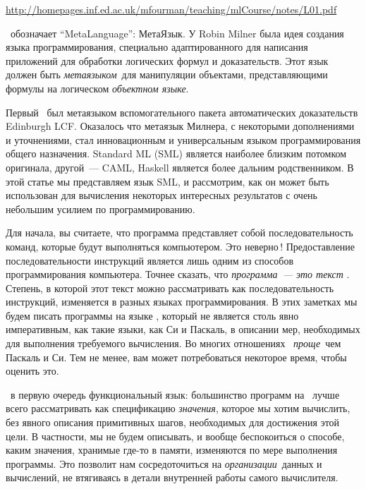 \label{fourmanru}\secdown

\url{http://homepages.inf.ed.ac.uk/mfourman/teaching/mlCourse/notes/L01.pdf}


\ml\ обозначает “MetaLanguage”: МетаЯзык. У Robin Milner была идея создания
языка программирования, специально адаптированного для написания приложений для
обработки логических формул и доказательств. Этот язык должен быть
\emph{метаязыком}\ для манипуляции объектами, представляющими формулы на
логическом \emph{объектном языке}.

Первый \ml\ был метаязыком вспомогательного пакета автоматических доказательств
Edinburgh LCF. Оказалось что метаязык Милнера, с некоторыми дополнениями и
уточнениями, стал инновационным и универсальным языком программирования общего
назначения. Standard ML (SML) является наиболее близким потомком оригинала,
другой\ --- CAML, Haskell является более дальним родственником. В этой статье мы
представляем язык SML, и рассмотрим, как он может быть использован для
вычисления некоторых интересных результатов с очень небольшим усилием по
программированию.

Для начала, вы считаете, что программа представляет собой последовательность
команд, которые будут выполняться компьютером. Это неверно\,! Предоставление
последовательности инструкций является лишь одним из способов программирования
компьютера. Точнее сказать, что \emph{программа\ --- это текст
}. Степень, в которой этот текст можно
рассматривать как последовательность инструкций, изменяется в разных языках
программирования. В этих заметках мы будем писать программы на языке \ml,
который не является столь явно императивным, как такие языки, как Си и Паскаль,
в описании мер, необходимых для выполнения требуемого вычисления. Во многих
отношениях \ml\ \emph{проще}\ чем Паскаль и Си. Тем не менее, вам может
потребоваться некоторое время, чтобы оценить это.

\ml\ в первую очередь функциональный язык: большинство программ на \ml\  лучше
всего рассматривать как спецификацию \emph{значения}, которое мы хотим
вычислить, без явного описания примитивных шагов, необходимых для достижения
этой цели. В частности, мы не будем описывать, и вообще беспокоиться о способе,
каким значения, хранимые где-то в памяти, изменяются по мере выполнения
программы. Это позволит нам сосредоточиться на \emph{организации}\ данных и
вычислений, не втягиваясь в детали внутренней работы самого вычислителя.

